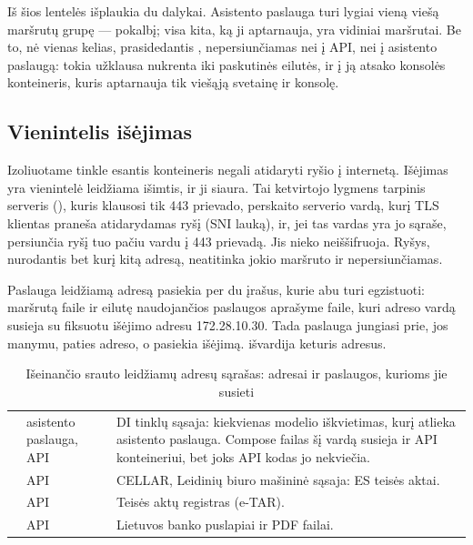 Iš šios lentelės išplaukia du dalykai. Asistento paslauga turi lygiai vieną viešą maršrutų
grupę --- pokalbį; visa kita, ką ji aptarnauja, yra vidiniai maršrutai. Be to, nė vienas
kelias, prasidedantis , nepersiunčiamas nei į API, nei į asistento paslaugą:
tokia užklausa nukrenta iki paskutinės eilutės, ir į ją atsako konsolės konteineris, kuris
aptarnauja tik viešąją svetainę ir konsolę.

\subsection{Vienintelis išėjimas}

Izoliuotame tinkle esantis konteineris negali atidaryti ryšio į internetą. Išėjimas yra
vienintelė leidžiama išimtis, ir ji siaura. Tai ketvirtojo lygmens tarpinis serveris
(), kuris klausosi tik 443 prievado, perskaito serverio vardą, kurį TLS
klientas praneša atidarydamas ryšį (SNI lauką), ir, jei tas vardas yra jo sąraše, persiunčia
ryšį tuo pačiu vardu į 443 prievadą. Jis nieko neiššifruoja. Ryšys, nurodantis bet kurį kitą
adresą, neatitinka jokio maršruto ir nepersiunčiamas.

Paslauga leidžiamą adresą pasiekia per du įrašus, kurie abu turi egzistuoti: maršrutą
 faile ir  eilutę naudojančios paslaugos aprašyme
 faile, kuri adreso vardą susieja su fiksuotu išėjimo adresu
172.28.10.30. Tada paslauga jungiasi prie, jos manymu, paties adreso, o pasiekia išėjimą.
 išvardija keturis adresus.

\begin{table}[H]
\caption{Išeinančio srauto leidžiamų adresų sąrašas:  adresai ir
  paslaugos, kurioms jie susieti}\label{tab:arch:egress}
\begin{tabularx}{\textwidth}{@{}L{38mm}L{30mm}Y@{}}
\toprule
{} &  &  \\
\midrule
{} & asistento paslauga, API & DI tinklų sąsaja: kiekvienas modelio iškvietimas, kurį atlieka asistento paslauga. Compose failas šį vardą susieja ir API konteineriui, bet joks API kodas jo nekviečia. \\
 & API & CELLAR, Leidinių biuro mašininė sąsaja: ES teisės aktai. \\
 & API & Teisės aktų registras (e-TAR). \\
 & API & Lietuvos banko puslapiai ir PDF failai. \\
\bottomrule
\end{tabularx}
\end{table}

